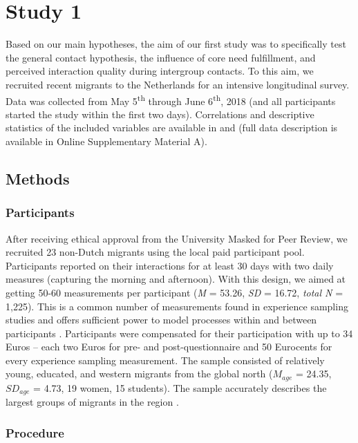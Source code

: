 \section{Study 1}

Based on our main hypotheses, the aim of our first study was to
specifically test the general contact hypothesis, the influence of core
need fulfillment, and perceived interaction quality during intergroup
contacts. To this aim, we recruited recent migrants to the Netherlands
for an intensive longitudinal survey. Data was collected from May
5\textsuperscript{th} through June 6\textsuperscript{th}, 2018 (and all
participants started the study within the first two days). Correlations
and descriptive statistics of the included variables are available in
 and  (full data
description is available in Online Supplementary Material A).

\subsection{Methods}

\subsubsection{Participants}

After receiving ethical approval from the University Masked for Peer
Review, we recruited 23 non-Dutch migrants using the local paid
participant pool. Participants reported on their interactions for at
least 30 days with two daily measures (capturing the morning and
afternoon). With this design, we aimed at getting 50-60 measurements per
participant (\textit{M} = 53.26, \textit{SD} = 16.72, \textit{total N} =
1,225). This is a common number of measurements found in experience
sampling studies and offers sufficient power to model processes within
and between participants
\citep[e.g., for a systematic review see][]{AanhetRot2012}. Participants
were compensated for their participation with up to 34 Euros -- each two
Euros for pre- and post-questionnaire and 50 Eurocents for every
experience sampling measurement. The sample consisted of relatively
young, educated, and western migrants from the global north (\(M_{age}\)
= 24.35, \(SD_{age}\) = 4.73, 19 women, 15 students). The sample
accurately describes the largest groups of migrants in the region
\citep[][]{GemeenteGroningen2015}.

\subsubsection{Procedure}

